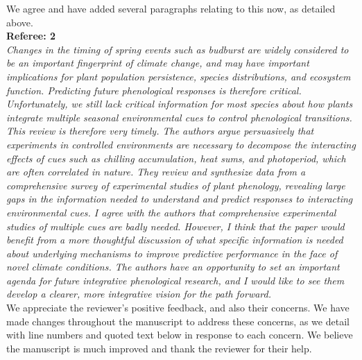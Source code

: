 \documentclass[11pt,letter]{article}
\begin{document}
We agree and have added several paragraphs relating to this now, as detailed above.\\

{\bf Referee: 2}\\

\emph{Changes in the timing of spring events such as budburst are widely considered to be an important fingerprint of climate change, and may have important implications for plant population persistence, species distributions, and ecosystem function.   Predicting future phenological responses is therefore critical.  Unfortunately, we still lack critical information for most species about how plants integrate multiple seasonal environmental cues to control phenological transitions.  This review is therefore very timely.  The authors argue persuasively that experiments in controlled environments are necessary to decompose the interacting effects of cues such as chilling accumulation, heat sums, and photoperiod, which are often correlated in nature.  They review and synthesize data from a comprehensive survey of experimental studies of plant phenology, revealing large gaps in the information needed to understand and predict responses to interacting environmental cues.  I agree with the authors that comprehensive experimental studies of multiple cues are badly needed.   However, I think that the paper would benefit from a more thoughtful discussion of what specific information is needed about underlying mechanisms to improve predictive performance in the face of novel climate conditions. The authors have an opportunity to set an important agenda for future integrative phenological research, and I would like to see them develop a clearer, more integrative vision for the path forward.}\\

We appreciate the reviewer's positive feedback, and also their concerns. We have made changes throughout the manuscript to address these concerns, as we detail with line numbers and quoted text below in response to each concern. We believe the manuscript is much improved and thank the reviewer for their help. \\
\end{document}
